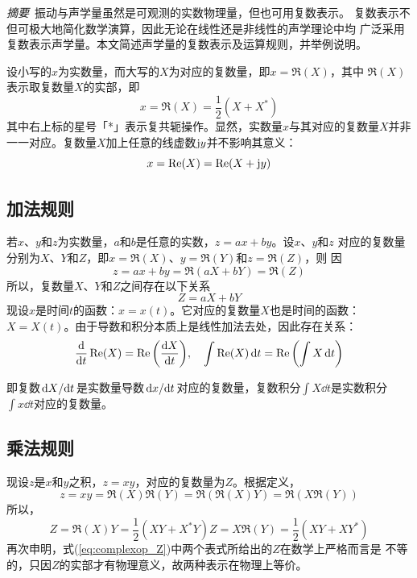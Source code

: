 \documentclass[UTF8]{ctexbook}
\begin{document}
\emph{摘要}\ 振动与声学量虽然是可观测的实数物理量，但也可用复数表示。
复数表示不但可极大地简化数学演算，因此无论在线性还是非线性的声学理论中均
广泛采用复数表示声学量。本文简述声学量的复数表示及运算规则，并举例说明。

设小写的$x$为实数量，而大写的$X$为对应的复数量，即$x=\Re(X)$，其中
$\Re(X)$表示取复数量$X$的实部，即
$$
x = \Re(X) = \frac12(X+X^*)
$$
其中右上标的星号「*」表示复共轭操作。显然，实数量$x$与其对应的复数量$X$并非
一一对应。复数量$X$加上任意的线虚数$\mathrm{j} y$并不影响其意义：
$$
x = \Re(X) = \Re(X+\mathrm{j} y)
$$

\subsection{加法规则}
若$x$、$y$和$z$为实数量，$a$和$b$是任意的实数，$z=ax+by$。设$x$、$y$和$z$
对应的复数量分别为$X$、$Y$和$Z$，即$x=\Re(X)$、$y=\Re(Y)$和$z=\Re(Z)$，则
因
$$
z = ax+by = \Re(aX+bY) = \Re(Z)
$$
所以，复数量$X$、$Y$和$Z$之间存在以下关系
$$Z=aX+bY$$
现设$x$是时间$t$的函数：$x=x(t)$。它对应的复数量$X$也是时间的函数：$X=
X(t)$。由于导数和积分本质上是线性加法去处，因此存在关系：
$$\dv{t} \Re(X) =\Re\qty(\dv{X}{t})\qc \int \Re(X) \dd{t} = \Re 
\qty(\int X\dd{t})$$

即复数$\dv*{X}{t}$是实数量导数$\dv*{x}{t}$对应的复数量，复数积分$\int X
\dd{t}$是实数积分$\int x\dd{t}$对应的复数量。

\subsection{乘法规则}
现设$z$是$x$和$y$之积，$z=xy$，对应的复数量为$Z$。根据定义，
$$z=xy =\Re(X)\Re(Y) = \Re(\Re(X)Y)=\Re(X\Re(Y))$$
所以，
\begin{subequations}
	\label{eq:complexop_Z}
	\begin{equation}Z= \Re(X)Y = \frac12 (XY+X^*Y)\end{equation}
	\begin{equation}Z=X\Re(Y) = \frac12 (XY+XY^*)\end{equation}
\end{subequations}
再次申明，式(\ref{eq:complexop_Z})中两个表式所给出的$Z$在数学上严格而言是
不等的，只因$Z$的实部才有物理意义，故两种表示在物理上等价。
\end{document}

